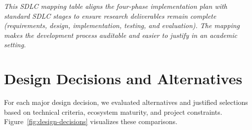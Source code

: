 \documentclass[12pt,a4paper]{report}
\begin{document}
\vspace{2pt}
\noindent\textit{\small This SDLC mapping table aligns the four-phase implementation plan with standard SDLC stages to ensure research deliverables remain complete (requirements, design, implementation, testing, and evaluation). The mapping makes the development process auditable and easier to justify in an academic setting.}


\section{Design Decisions and Alternatives}

For each major design decision, we evaluated alternatives and justified selections based on technical criteria, ecosystem maturity, and project constraints. Figure~\ref{fig:design-decisions} visualizes these comparisons.
\end{document}
